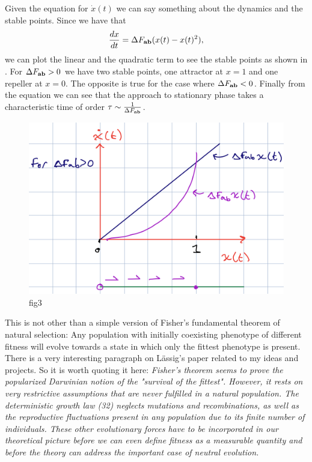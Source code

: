 Given the equation for $\dot{x}(t)$ we can say something about the dynamics and
the stable points. Since we have that
\begin{equation}
  {d{x} \over dt} = \Delta F_{\mathbf{ab}} (x(t) - x(t)^2),
\end{equation}
we can plot the linear and the quadratic term to see the stable points as shown
in . For $\Delta F_{\mathbf{ab}} > 0$ we have two stable points, one
attractor at $x = 1$ and one repeller at $x = 0$. The opposite is true for the
case where $\Delta F_{\mathbf{ab}} < 0$. Finally from the equation we can see that the approach to
stationary phase takes a characteristic time of order $\tau \sim {1 \over \Delta F_{\mathbf{ab}}}$.

\begin{figure}[h!]
	\centering \includegraphics[scale=0.5]{../fig/lassig_2007/phase_portrait.png}
	\caption{fig3}
  \label{fig_phase_portrait}
\end{figure}

This is not other than a simple version of Fisher's fundamental theorem of
natural selection: Any population with initially coexisting phenotype of
different fitness will evolve towards a state in which only the fittest
phenotype is present. There is a very interesting paragraph on L\"{a}ssig's paper
related to my ideas and projects. So it is worth quoting it here:
{\it Fisher's theorem seems to prove the popularized Darwinian notion of the
"survival of the fittest". However, it rests on very restrictive assumptions
that are never fulfilled in a natural population. The deterministic growth law
(32) neglects mutations and recombinations, as well as the reproductive
fluctuations present in any population due to its finite number of individuals.
These other evolutionary forces have to be incorporated in our theoretical
picture before we can even define fitness as a measurable quantity and before
the theory can address the important case of neutral evolution.}

